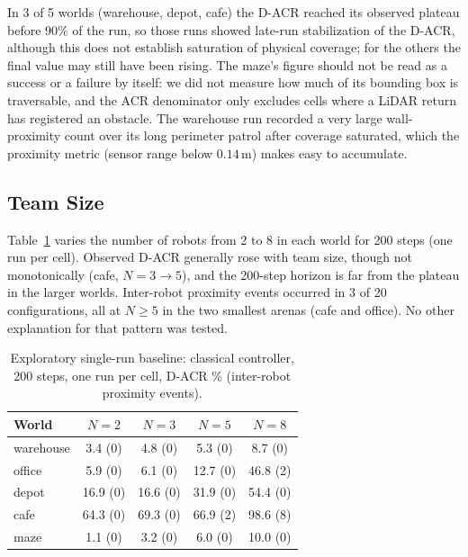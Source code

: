 \documentclass[conference]{IEEEtran}
\newcommand{\si}[1]{\mathrm{#1}}
\begin{document}
In 3 of 5 worlds (warehouse, depot, cafe) the D-ACR reached its observed plateau before 90\% of the run, so those runs showed late-run stabilization of the D-ACR, although this does not establish saturation of physical coverage; for the others the final value may still have been rising. The maze's figure should not be read as a success or a failure
by itself: we did not measure how much of its bounding box is traversable, and
the ACR denominator only excludes cells where a LiDAR return has registered an
obstacle. The warehouse run recorded a very large wall-proximity count over its
long perimeter patrol after coverage saturated, which the proximity metric
(sensor range below $0.14\,\si{m}$) makes easy to accumulate.

\subsection{Team Size}
Table~\ref{tab:sweep} varies the number of robots from 2 to 8 in each world for
200 steps (one run per cell). Observed D-ACR generally rose with team size, though not
monotonically (cafe, $N{=}3\to5$), and the 200-step horizon is far from the
plateau in the larger worlds. Inter-robot proximity events occurred in 3 of 20 configurations,
all at $N\ge5$ in the two smallest arenas (cafe and office). No other
explanation for that pattern was tested.

\begin{table}[t]
\centering
\caption{Exploratory single-run baseline: classical controller, 200 steps, one run per cell, D-ACR \% (inter-robot proximity events).}
\label{tab:sweep}
\footnotesize
\begin{tabular}{@{}lcccc@{}}
\toprule
World & $N{=}2$ & $N{=}3$ & $N{=}5$ & $N{=}8$ \\
\midrule
warehouse & 3.4 (0) & 4.8 (0) & 5.3 (0) & 8.7 (0) \\
office & 5.9 (0) & 6.1 (0) & 12.7 (0) & 46.8 (2) \\
depot & 16.9 (0) & 16.6 (0) & 31.9 (0) & 54.4 (0) \\
cafe & 64.3 (0) & 69.3 (0) & 66.9 (2) & 98.6 (8) \\
maze & 1.1 (0) & 3.2 (0) & 6.0 (0) & 10.0 (0) \\
\bottomrule
\end{tabular}
\end{table}
\end{document}
